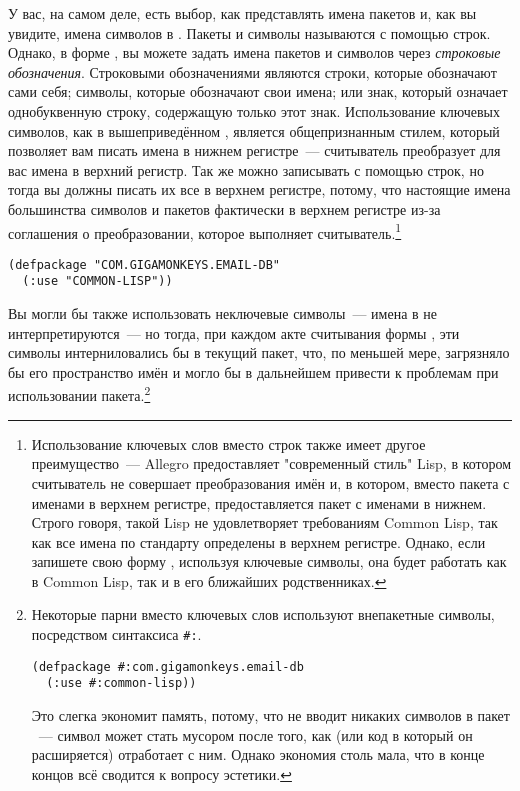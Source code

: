 У вас, на самом деле, есть выбор, как представлять имена пакетов и, как вы увидите, имена
символов в . Пакеты и символы называются с помощью строк. Однако, в форме
, вы можете задать имена пакетов и символов через \textit{строковые
  обозначения}. Строковыми обозначениями являются строки, которые обозначают сами себя;
символы, которые обозначают свои имена; или знак, который означает однобуквенную строку,
содержащую только этот знак. Использование ключевых символов, как в вышеприведённом
, является общепризнанным стилем, который позволяет вам писать имена в
нижнем регистре~--- считыватель преобразует для вас имена в верхний регистр.  Так же можно
записывать  с помощью строк, но тогда вы должны писать их все в верхнем
регистре, потому, что настоящие имена большинства символов и пакетов фактически в верхнем
регистре из-за соглашения о преобразовании, которое выполняет
считыватель.\footnote{Использование ключевых слов вместо строк также имеет другое
  преимущество~--- Allegro предоставляет "современный стиль" Lisp, в котором считыватель не
  совершает преобразования имён и, в котором, вместо пакета  с именами в
  верхнем регистре, предоставляется пакет  с именами в нижнем. Строго
  говоря, такой Lisp не удовлетворяет требованиям Common Lisp, так как все имена по
  стандарту определены в верхнем регистре. Однако, если запишете свою форму
  , используя ключевые символы, она будет работать как в Common Lisp, так
  и в его ближайших родственниках.}

\begin{lstlisting}
(defpackage "COM.GIGAMONKEYS.EMAIL-DB"
  (:use "COMMON-LISP"))
\end{lstlisting}

Вы могли бы также использовать неключевые символы~--- имена в  не
интерпретируются~--- но тогда, при каждом акте считывания формы , эти
символы интерниловались бы в текущий пакет, что, по меньшей мере, загрязняло бы его
пространство имён и могло бы в дальнейшем привести к проблемам при использовании
пакета.\footnote{Некоторые парни вместо ключевых слов используют внепакетные символы,
  посредством синтаксиса \lstinline!#:!.

\begin{lstlisting}
(defpackage #:com.gigamonkeys.email-db
  (:use #:common-lisp))
\end{lstlisting}

Это слегка экономит память, потому, что не вводит никаких символов в пакет 
~--- символ может стать мусором после того, как  (или код в который он
расширяется) отработает с ним. Однако экономия столь мала, что в конце концов всё сводится
к вопросу эстетики.}

